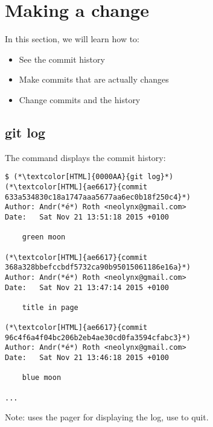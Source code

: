 \section{Making a change}
\begin{frame}[fragile]
  \slidetitle

  In this section, we will learn how to:
  \begin{itemize}
    \item See the commit history
    \item Make commits that are actually changes
    \item Change commits and the history
  \end{itemize}
\end{frame}

\subsection{git log}
\begin{frame}[fragile]
  \subslidetitle

  The command  displays the commit history:
  \begin{lstlisting}
$ (*\textcolor[HTML]{0000AA}{git log}*)
(*\textcolor[HTML]{ae6617}{commit 633a534830c18a1747aaa5677aa6ec0b18f250c4}*)
Author: Andr(*é*) Roth <neolynx@gmail.com>
Date:   Sat Nov 21 13:51:18 2015 +0100

    green moon

(*\textcolor[HTML]{ae6617}{commit 368a328bbefccbdf5732ca90b95015061186e16a}*)
Author: Andr(*é*) Roth <neolynx@gmail.com>
Date:   Sat Nov 21 13:47:14 2015 +0100

    title in page

(*\textcolor[HTML]{ae6617}{commit 96c4f6a4f04bc206b2eb4ae30cd0fa3594cfabc3}*)
Author: Andr(*é*) Roth <neolynx@gmail.com>
Date:   Sat Nov 21 13:46:18 2015 +0100

    blue moon

...
\end{lstlisting}
Note:  uses the pager for displaying the log, use  to quit.
\end{frame}


